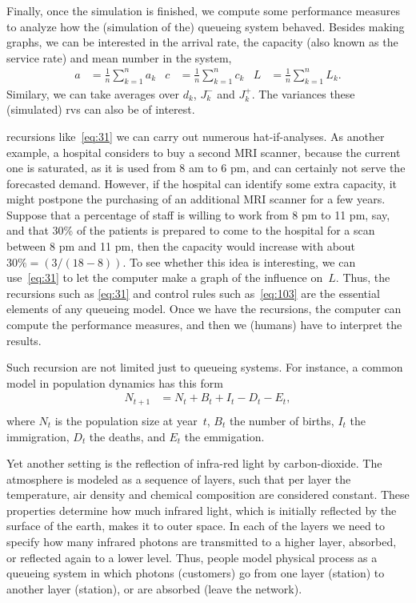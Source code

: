 \documentclass[queueing-book.tex]{subfiles}
\begin{document}
Finally, once the simulation is finished, we compute some performance measures to analyze how the (simulation of the) queueing system behaved.
Besides making graphs, we can be interested in the arrival rate, the capacity (also known as the service rate) and mean number in the system,
\begin{align*}
a &= \frac{1}{n} \sum_{k=1}^{n} a_{k} &
c &= \frac{1}{n} \sum_{k=1}^{n} c_{k} &
L &= \frac{1}{n} \sum_{k=1}^{n} L_{k}.
\end{align*}
Similary, we can take averages over $d_{k}$, $J_k^{-}$ and $J_k^{+}$. The variances these (simulated) rvs can also be of interest.


 recursions like~\cref{eq:31} we can carry out numerous hat-if-analyses.
As another example, a hospital considers to buy a second MRI scanner, because the current one is saturated, as it is used from 8 am to 6 pm, and can certainly not serve the forecasted demand.
However, if the hospital can identify some extra capacity, it might postpone the purchasing of an additional MRI scanner for a few years.
Suppose that a percentage of staff is willing to work from 8 pm to 11 pm, say, and that 30\% of the patients
is prepared to come to the hospital for a scan between 8 pm and 11 pm, then the capacity would increase with about $30\% = (3/(18-8))$.
To see whether this idea is interesting, we can use~\cref{eq:31} to let the computer make a graph of the influence on~$L$.
Thus, the recursions such as \cref{eq:31} and control rules such as~\cref{eq:103} are the essential elements of any queueing model.
Once we have the recursions, the computer can compute the performance measures, and then we (humans) have to interpret the results.

Such recursion are not limited just to queueing systems. For instance, a common model in population dynamics has this form
\begin{align*}
  N_{t+1} &= N_t + B_t + I_t - D_t - E_{t}, \\
\end{align*}
where $N_t$ is the population size at year~$t$, $B_{t}$ the number of births, $I_{t}$ the immigration, $D_{t}$ the deaths, and $E_{t}$ the emmigation.

Yet another setting is the reflection of infra-red light by carbon-dioxide.
The atmosphere is modeled as a sequence of layers, such that per layer the temperature, air density and chemical composition are considered constant.
These properties determine how much infrared light, which is initially reflected by the surface of the earth, makes it to outer space.
In each of the layers we need to specify how many infrared photons are transmitted to a higher layer, absorbed, or reflected again to a lower level.
Thus, people model physical process as a queueing system in which photons (customers) go from one layer (station) to another layer (station), or are absorbed (leave the network).
\end{document}
